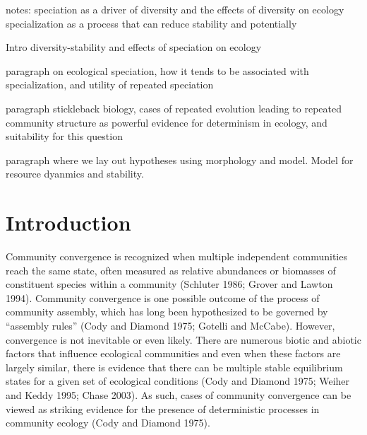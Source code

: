 \documentclass[11pt]{article}
\begin{document}
notes:
speciation as a driver of diversity and the effects of diversity on ecology
specialization as a process that can reduce stability and potentially 


Intro
diversity-stability and effects of speciation on ecology

paragraph on ecological speciation, how it tends to be associated with specialization, and utility of repeated speciation

paragraph stickleback biology, cases of repeated evolution leading to repeated community structure as powerful evidence for determinism in ecology, and suitability for this question

paragraph where we lay out hypotheses using morphology and model. Model for resource dyanmics and stability. 

\newpage{}

\section*{Introduction}


Community convergence is recognized when multiple independent communities reach the same state, often measured as relative abundances or biomasses of constituent species within a community (Schluter 1986; Grover and Lawton 1994).  Community convergence is one possible outcome of the process of community assembly, which has long been hypothesized to be governed by “assembly rules” (Cody and Diamond 1975; Gotelli and McCabe).  However, convergence is not inevitable or even likely.  There are numerous biotic and abiotic factors that influence ecological communities and even when these factors are largely similar, there is evidence that there can be multiple stable equilibrium states for a given set of ecological conditions (Cody and Diamond 1975; Weiher and Keddy 1995; Chase 2003).  As such, cases of community convergence can be viewed as striking evidence for the presence of deterministic processes in community ecology (Cody and Diamond 1975).  
\end{document}

